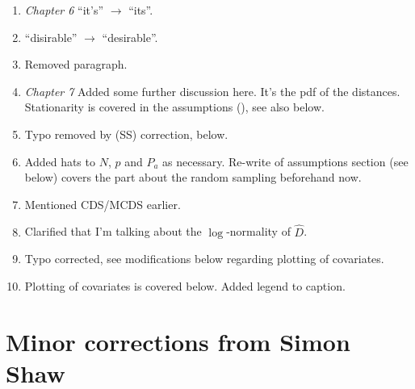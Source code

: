 \begin{enumerate}
\item {} \textit{Chapter 6} ``it's'' $\rightarrow$ ``its''.
\item {} ``disirable'' $\rightarrow$ ``desirable''.
\item {} Removed paragraph.
\item {} \textit{Chapter 7} Added some further discussion here.  It's the pdf of the distances. Stationarity is covered in the assumptions (), see also below.
\item {} Typo removed by (SS) correction, below.
\item {} Added hats to $N$, $p$ and $P_a$ as necessary. Re-write of assumptions section (see below) covers the part about the random sampling beforehand now.
\item {} Mentioned CDS/MCDS earlier.
\item {} Clarified that I'm talking about the $\log$-normality of $\hat{D}$.
\item {} Typo corrected, see modifications below regarding plotting of covariates.
\item {} Plotting of covariates is covered below. Added legend to caption.
\end{enumerate}

\section{Minor corrections from Simon Shaw}
\label{shaw}

